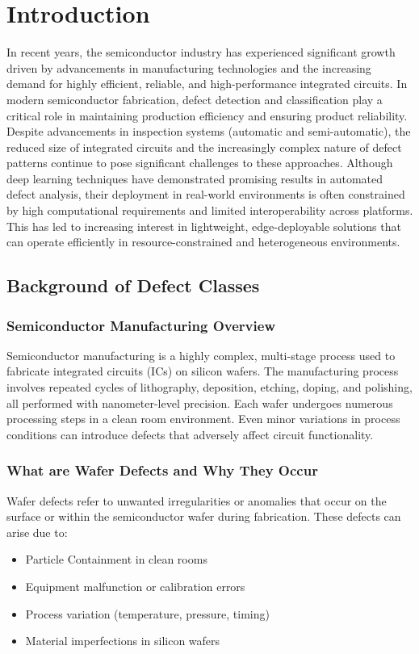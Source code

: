 \chapter{Introduction}

 In recent years, the semiconductor industry has experienced significant growth driven by advancements in manufacturing technologies and the increasing demand for highly efficient, reliable, and high-performance integrated circuits. In modern semiconductor fabrication, defect detection and classification play a critical role in maintaining production efficiency and ensuring product reliability. Despite advancements in inspection systems (automatic and semi-automatic), the reduced size of integrated circuits and the increasingly complex nature of defect patterns continue to pose significant challenges to these approaches. Although deep learning techniques have demonstrated promising results in automated defect analysis, their deployment in real-world environments is often constrained by high computational requirements and limited interoperability across platforms. This has led to increasing interest in lightweight, edge-deployable solutions that can operate efficiently in resource-constrained and heterogeneous environments. 


\section{Background of Defect Classes}
\subsection{Semiconductor Manufacturing Overview}
Semiconductor manufacturing is a highly complex, multi-stage process used to fabricate integrated circuits (ICs) on silicon wafers. The manufacturing process involves repeated cycles of lithography, deposition, etching, doping, and polishing, all performed with nanometer-level precision.
Each wafer undergoes numerous processing steps in a clean room environment. Even minor variations in process conditions can introduce defects that adversely affect circuit functionality.


\subsection{What are Wafer Defects and Why They Occur}
Wafer defects refer to unwanted irregularities or anomalies that occur on the surface or within the semiconductor wafer during fabrication. These defects can arise due to:
\begin{itemize}
\item Particle Containment in clean rooms
\item Equipment malfunction or calibration errors
\item Process variation (temperature, pressure, timing)
\item Material imperfections in silicon wafers
\end{itemize}

